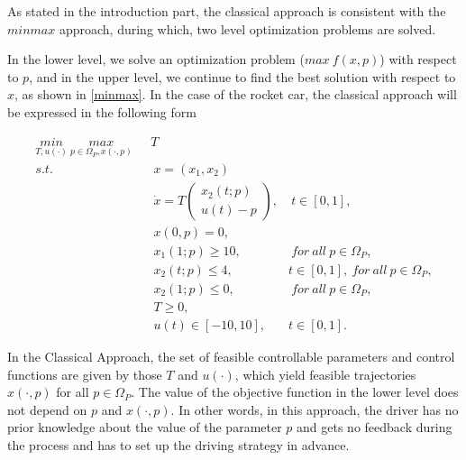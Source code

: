 \documentclass  [
  paper    = a4,
  BCOR     = 10mm,
  twoside,
  fontsize = 12pt,
  fleqn,
  toc      = bibnumbered,
  toc      = listofnumbered,
  numbers  = noendperiod,
  headings = normal,
  listof   = leveldown,
  version  = 3.03
]                                       {scrreprt}
\newcommand{\<}{\langle}
\renewcommand{\>}{\rangle}
\begin{document}
   As stated in the introduction part, the classical approach is consistent with the $minmax$ approach, during which, two level optimization problems are solved. 
   
   In the lower level, we solve an optimization problem ($max \  f(x,p)$) with respect to $p$, and in the upper level, we continue to find the best solution with respect to $x$, as shown in \ref{minmax}. In the case of the rocket car, the classical approach will be expressed in the following form
   
   \begin{subequations}
   	\begin{align}
   	\underset{T, u(\cdot)}{min} \  \underset{ p \in \Omega_P, x(\cdot,p)}{max}  \ \   & \  T \\ 
   	s.t.  & \ \ x = (x_1, x_2)   \label{ca_rc_x} \\ 
   	& \ \  \dot{x} = T  \begin{pmatrix}  x_2(t;p) \\ u(t)-p   \end{pmatrix}, & \ t \in [0,1],  \label{ca_rc_partial} \\
   	& \ \ x(0,p) = 0, \label{ca_rc_t0}\\
   	& \ \ x_1(1;p) \geq 10, & \ for \ all \ p \in \Omega_P, \label{ca_rc_x1_t1} \\
   	& \ \ x_2(t;p) \leq 4, & t \in [0,1], \ for \ all \ p \in \Omega_P,  \label{ca_rc_x2_tc} \\
   	& \ \ x_2(1;p) \leq 0, & \ for \ all \ p \in \Omega_P, \label{ca_rc_x2_t1}  \\
   	& \ \ T \geq 0, \\
   	& \ \ u(t) \in [-10, 10], & t \in [0,1]. 
   	\end{align}
   	\label{ca_rc}
   \end{subequations}
   
   In the Classical Approach, the set of feasible controllable parameters and control functions are given by those $T$ and $u(\cdot)$, which yield feasible trajectories $x(\cdot, p)$ for all $p \in \Omega_P$. The value of the objective function in the lower level does not depend on $p$ and $x(\cdot, p)$. In other words, in this approach, the driver has no prior knowledge about the value of the parameter $p$ and gets no feedback during the process and has to set up the driving strategy in advance. 
   
\end{document}
